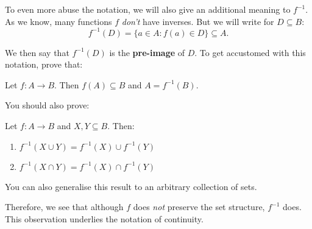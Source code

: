 \noindent To even more abuse the notation, we will also give an additional meaning to $f^{-1}$. As we know, many functions $f$ \textit{don't} have inverses. But we will write for $D\subseteq B$:
$$f^{-1}(D) = \{a \in A : f(a)\in D\}\subseteq A.$$

We then say that $f^{-1}(D)$ is the \textbf{pre-image} of $D$.
To get accustomed with this notation, prove that:

\begin{prob}
  Let $f:A\to B$. Then $f(A)\subseteq B$ and $A=f^{-1}(B)$.
\end{prob}

You should also prove:
\begin{prob}
  Let $f:A\to B$ and $X,Y\subseteq B$. Then:
  \begin{enumerate}
    \item $f^{-1}(X\cup Y)=f^{-1}(X)\cup f^{-1}(Y)$
    \item $f^{-1}(X\cap Y)=f^{-1}(X)\cap f^{-1}(Y)$
  \end{enumerate}
  You can also generalise this result to an arbitrary collection of
  sets.
\end{prob}
Therefore, we see that although $f$ does \textit{not} preserve the
set structure, $f^{-1}$ does. This observation underlies the
notation of continuity.
